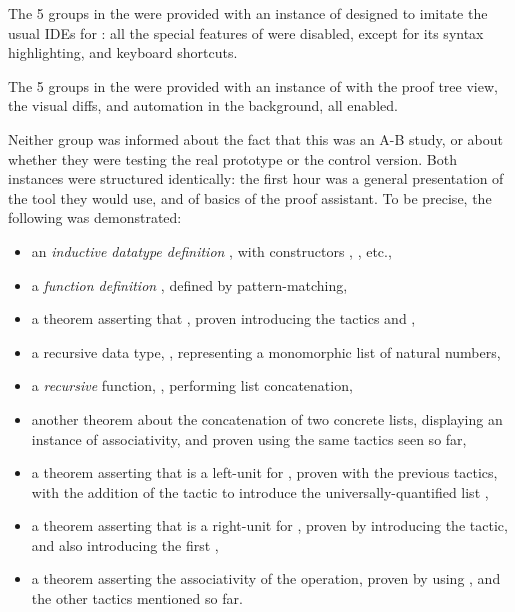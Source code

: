 The 5 groups in the  were provided with an instance of
\PeaCoq{} designed to imitate the usual IDEs for \Coq{}: all the special
features of \PeaCoq{} were disabled, except for its syntax highlighting, and
keyboard shortcuts.

The 5 groups in the  were provided with an instance of
\PeaCoq{} with the proof tree view, the visual diffs, and automation in the
background, all enabled.

Neither group was informed about the fact that this was an A-B study, or about
whether they were testing the real prototype or the control version.  Both
instances were structured identically: the first hour was a general presentation
of the tool they would use, and of basics of the \Coq{} proof assistant.  To be
precise, the following was demonstrated:

\begin{itemize}

\item an \emph{inductive datatype definition} , with constructors
, , etc.,

\item a \emph{function definition} , defined by
pattern-matching,

\item a theorem asserting that , proven
introducing the tactics  and ,

\item a recursive data type, , representing a monomorphic
list of natural numbers,

\item a \emph{recursive} function, , performing list
concatenation,

\item another theorem about the concatenation of two concrete lists, displaying
an instance of associativity, and proven using the same tactics seen so far,

\item a theorem asserting that  is a left-unit for
, proven with the previous tactics, with the addition of the
 tactic to introduce the universally-quantified list
,

\item a theorem asserting that  is a right-unit for
, proven by introducing the  tactic, and
also introducing the first ,

\item a theorem asserting the associativity of the  operation,
proven by using , and the other tactics mentioned so far.

\end{itemize}

